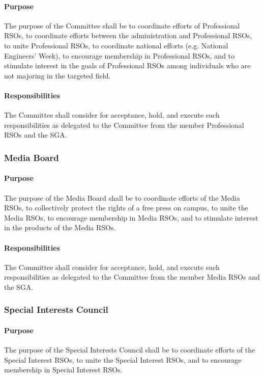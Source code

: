 \documentclass[12pt]{scrreprt}
\begin{document}
\paragraph{Purpose}
The purpose of the Committee shall be to coordinate efforts of Professional 
RSOs, to coordinate efforts between the administration and Professional RSOs, 
to unite Professional RSOs, to coordinate national efforts (e.g. National 
Engineers' Week), to encourage membership in Professional RSOs, and to 
stimulate interest in the goals of Professional RSOs among individuals who are 
not majoring in the targeted field.

\paragraph{Responsibilities}
The Committee shall consider for acceptance, hold, and execute such
responsibilities as delegated to the Committee from the member Professional 
RSOs and the SGA.

\subsubsection{Media Board}

\paragraph{Purpose}
The purpose of the Media Board shall be to coordinate efforts of the Media 
RSOs, to collectively protect the rights of a free press on campus, to unite 
the Media RSOs, to encourage membership in Media RSOs, and to stimulate 
interest in the products of the Media RSOs.

\paragraph{Responsibilities}
The Committee shall consider for acceptance, hold, and execute such
responsibilities as delegated to the Committee from the member Media RSOs and 
the SGA.

\subsubsection{Special Interests Council}

\paragraph{Purpose}
The purpose of the Special Interests Council shall be to coordinate efforts of 
the Special Interest RSOs, to unite the Special Interest RSOs, and to 
encourage membership in Special Interest RSOs.
\end{document}
